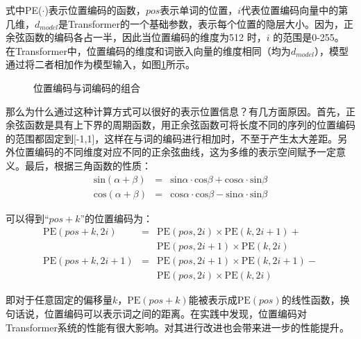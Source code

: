 \noindent 式中PE($\cdot$)表示位置编码的函数，$pos$表示单词的位置，$i$代表位置编码向量中的第几维，$d_{model}$是Transformer的一个基础参数，表示每个位置的隐层大小。因为，正余弦函数的编码各占一半，因此当位置编码的维度为512 时，$i$ 的范围是0-255。 在Transformer中，位置编码的维度和词嵌入向量的维度相同（均为$d_{model}$），模型通过将二者相加作为模型输入，如图\ref{fig:6-43}所示。

\begin{figure}[htp]
\centering

\caption{位置编码与词编码的组合}
\label{fig:6-43}
\end{figure}

\parinterval 那么为什么通过这种计算方式可以很好的表示位置信息？有几方面原因。首先，正余弦函数是具有上下界的周期函数，用正余弦函数可将长度不同的序列的位置编码的范围都固定到[-1,1]，这样在与词的编码进行相加时，不至于产生太大差距。另外位置编码的不同维度对应不同的正余弦曲线，这为多维的表示空间赋予一定意义。最后，根据三角函数的性质：
\begin{eqnarray}
\textrm{sin}(\alpha + \beta) &=& \textrm{sin}\alpha \cdot \textrm{cos} \beta + \textrm{cos} \alpha \cdot \textrm{sin} \beta \nonumber  \\
\textrm{cos}(\alpha + \beta) &=&  \textrm{cos} \alpha  \cdot \textrm{cos} \beta - \textrm{sin} \alpha \cdot \textrm{sin} \beta
\label{eq:6-45}
\end{eqnarray}

\parinterval 可以得到``$pos+k$''的位置编码为：
\begin{eqnarray}
\textrm{PE}(pos+k,2i) &=& \textrm{PE}(pos,2i) \times \textrm{PE}(k,2i+1) + \nonumber \\
                      & & \textrm{PE}(pos,2i+1) \times \textrm{PE}(k,2i)\\
\textrm{PE}(pos+k ,2i+1) &=& \textrm{PE}(pos,2i+1) \times \textrm{PE}(k,2i+1) - \nonumber \\
                         & & \textrm{PE}(pos,2i) \times \textrm{PE}(k,2i)
\label{eq:6-46}
\end{eqnarray}

\noindent 即对于任意固定的偏移量$k$，$\textrm{PE}(pos+k)$能被表示成$\textrm{PE}(pos)$的线性函数，换句话说，位置编码可以表示词之间的距离。在实践中发现，位置编码对Transformer系统的性能有很大影响。对其进行改进也会带来进一步的性能提升\cite{Shaw2018SelfAttentionWR}。


